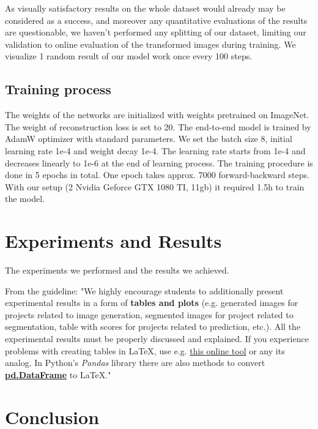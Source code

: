 \documentclass{article}
\begin{document}
As visually satisfactory results on the whole dataset would already may be 
considered as a success, and moreover any quantitative evaluations of the 
results are questionable, we haven't performed any splitting of our dataset, 
limiting our validation to online evaluation of the transformed images during 
training. We visualize 1 random result of our model work once every 100 steps.

\subsection{Training process}
The weights of the networks are initialized with weights pretrained on ImageNet. 
The weight of reconstruction loss is set to 20. The end-to-end model is trained 
by AdamW optimizer with standard parameters. We set the batch size 8, initial 
learning rate 1e-4 and weight decay 1e-4. The learning rate starts from 1e-4 
and decreases linearly to 1e-6 at the end of learning process. The training 
procedure is done in 5 epochs in total. One epoch takes approx. 7000 
forward-backward steps. With our setup (2 Nvidia Geforce GTX 1080 TI, 11gb) it 
required 1.5h to train the model.

\section{Experiments and Results}\label{experiments_and_results}

The experiments we performed and the results we achieved.

From the guideline: 
"We highly encourage students to additionally present experimental results in a 
form of \textbf{tables and plots} (e.g. generated images for projects related 
to image generation, segmented images for project related to segmentation, 
table with scores for projects related to prediction, etc.). All the 
experimental results must be properly discussed and explained. If you 
experience problems with creating tables in \LaTeX, use e.g. 
\href{https://www.tablesgenerator.com}{this online tool} or any its analog. In 
Python's \textit{Pandas} library there are also methods to convert 
\href{https://pandas.pydata.org/pandas-docs/stable/reference/api/pandas.DataFrame.to_latex.html}{\textbf{pd.DataFrame}} 
to \LaTeX."

\section{Conclusion}\label{conclusion}
\end{document}
